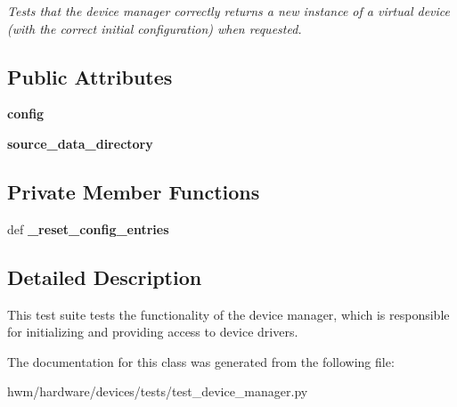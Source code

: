 \begin{DoxyCompactItemize}
\begin{DoxyCompactList}\small\item\em Tests that the device manager correctly returns a new instance of a virtual device (with the correct initial configuration) when requested. \end{DoxyCompactList}\end{DoxyCompactItemize}
\subsection*{Public Attributes}
\begin{DoxyCompactItemize}
\item 
\hypertarget{classhwm_1_1hardware_1_1devices_1_1tests_1_1test__device__manager_1_1_test_device_manager_a7b651f1196657eb7d69fd0ef1c1597f7}{{\bfseries config}}\label{classhwm_1_1hardware_1_1devices_1_1tests_1_1test__device__manager_1_1_test_device_manager_a7b651f1196657eb7d69fd0ef1c1597f7}

\item 
\hypertarget{classhwm_1_1hardware_1_1devices_1_1tests_1_1test__device__manager_1_1_test_device_manager_ae56c75d59bb77d780ddef8428491133c}{{\bfseries source\-\_\-data\-\_\-directory}}\label{classhwm_1_1hardware_1_1devices_1_1tests_1_1test__device__manager_1_1_test_device_manager_ae56c75d59bb77d780ddef8428491133c}

\end{DoxyCompactItemize}
\subsection*{Private Member Functions}
\begin{DoxyCompactItemize}
\item 
\hypertarget{classhwm_1_1hardware_1_1devices_1_1tests_1_1test__device__manager_1_1_test_device_manager_a7642ca474503125487424e5555da31e4}{def {\bfseries \-\_\-reset\-\_\-config\-\_\-entries}}\label{classhwm_1_1hardware_1_1devices_1_1tests_1_1test__device__manager_1_1_test_device_manager_a7642ca474503125487424e5555da31e4}

\end{DoxyCompactItemize}


\subsection{Detailed Description}
This test suite tests the functionality of the device manager, which is responsible for initializing and providing access to device drivers. 

The documentation for this class was generated from the following file\-:\begin{DoxyCompactItemize}
\item 
hwm/hardware/devices/tests/test\-\_\-device\-\_\-manager.\-py\end{DoxyCompactItemize}
